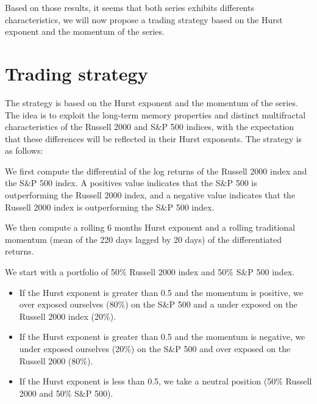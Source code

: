 \documentclass[11pt]{extarticle}
\begin{document}
Based on those results, it seems that both series exhibits differents characteristics, we will now propose a trading
strategy based on the Hurst exponent and the momentum of the series.

\section{Trading strategy}

The strategy is based on the Hurst exponent and the momentum of the series. The idea is to exploit the long-term memory
properties and distinct multifractal characteristics of the Russell 2000 and S\&P 500 indices, with the expectation that
these differences will be reflected in their Hurst exponents. The strategy is as follows:

We first compute the differential of the log returns of the Russell 2000 index and the S\&P 500 index.
A positives value indicates that the S\&P 500 is outperforming the Russell 2000 index,
and a negative value indicates that the Russell 2000 index is outperforming the S\&P 500 index.

We then compute a rolling 6 months Hurst exponent and a rolling traditional momentum (mean of the 220 days lagged by 20
days) of the differentiated returns.

We start with a portfolio of 50\% Russell 2000 index and 50\% S\&P 500 index.

\begin{itemize}
    \item If the Hurst exponent is greater than 0.5 and the momentum is positive, we over exposed ourselves (80\%) on the
        S\&P 500 and a under exposed on the Russell 2000 index (20\%).
    \item If the Hurst exponent is greater than 0.5 and the momentum is negative, we under exposed ourselves (20\%) on the
        S\&P 500 and over exposed on the Russell 2000 (80\%).
    \item If the Hurst exponent is less than 0.5, we take a neutral position (50\% Russell 2000 and 50\% S\&P 500).
\end{itemize}
\end{document}
